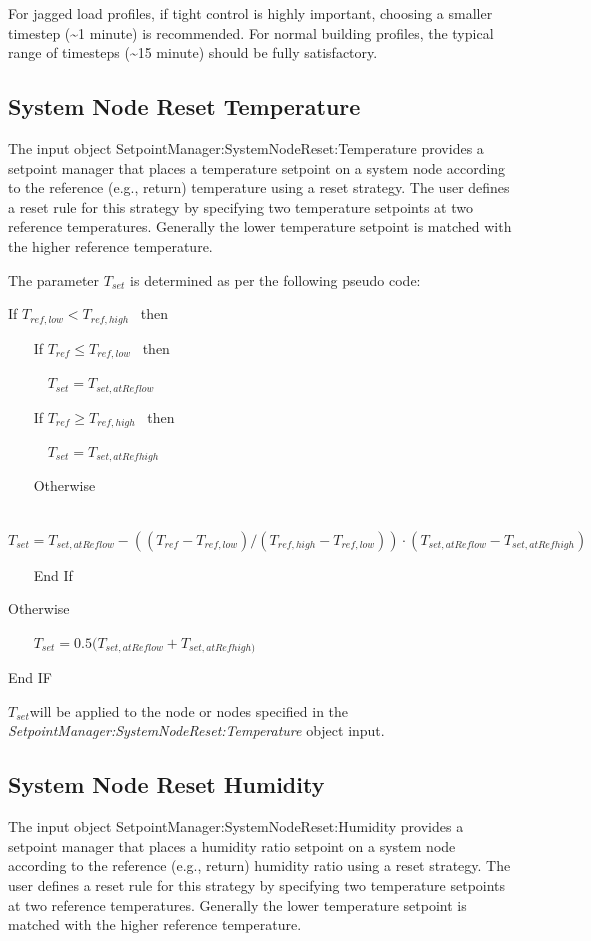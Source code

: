 For jagged load profiles, if tight control is highly important, choosing a smaller timestep (\textasciitilde{}1 minute) is recommended. For normal building profiles, the typical range of timesteps (\textasciitilde{}15 minute) should be fully satisfactory.

\subsection{System Node Reset Temperature}\label{system-node-reset-temperature}

The input object SetpointManager:SystemNodeReset:Temperature provides a setpoint manager that places a temperature setpoint on a system node according to the reference (e.g., return) temperature using a reset strategy. The user defines a reset rule for this strategy by specifying two temperature setpoints at two reference temperatures. Generally the lower temperature setpoint is matched with the higher reference temperature.

The parameter \(T_{set}\) is determined as per the following pseudo code:

If \({T_{ref,low}} < {T_{ref,high}}\) ~then

~~~ If \({T_{ref}} \le {T_{ref,low}}\) ~then

~~~~~ \({T_{set}} = {T_{set,atReflow}}\)

~~~ If \({T_{ref}} \ge {T_{ref,high}}\) ~then

~~~~~ \({T_{set}} = {T_{set,atRefhigh}}\)

~~~ Otherwise

~~~~~ \({T_{set}} = {T_{set,atReflow}} - (({T_{ref}} - {T_{ref,low}})/({T_{ref,high}} - {T_{ref,low}}))\cdot ({T_{set,atReflow}} - {T_{set,atRefhigh}})\)

~~~ End If

Otherwise

~~~ \({T_{set}} = 0.5({T_{set,atReflow}} + {T_{set,atRefhigh)}}\)

End IF

\emph{\({T_{set}}\)}will be applied to the node or nodes specified in the \emph{SetpointManager:SystemNodeReset:Temperature} object input.

\subsection{System Node Reset Humidity}\label{system-node-reset-humidity}

The input object SetpointManager:SystemNodeReset:Humidity provides a setpoint manager that places a humidity ratio setpoint on a system node according to the reference (e.g., return) humidity ratio using a reset strategy. The user defines a reset rule for this strategy by specifying two temperature setpoints at two reference temperatures. Generally the lower temperature setpoint is matched with the higher reference temperature.

